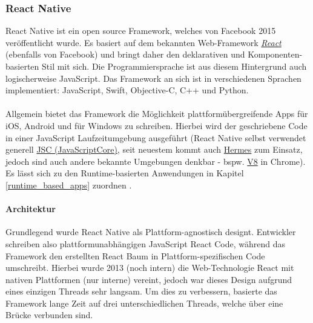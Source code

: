 \subsubsection{React Native}
\label{react-native}
React Native ist ein open source Framework, welches von Facebook 2015 veröffentlicht wurde. 
Es basiert auf dem bekannten Web-Framework \href{https://reactjs.org/}{\textit{React}} (ebenfalls von Facebook) und bringt daher den deklarativen und Komponenten-basierten Stil mit sich. 
Die Programmiersprache ist aus diesem Hintergrund auch logischerweise JavaScript.
Das Framework an sich ist in verschiedenen Sprachen implementiert: JavaScript, Swift, Objective-C, C++ und Python.\\
\\
Allgemein bietet das Framework die Möglichkeit plattformübergreifende Apps für iOS, Android und für Windows zu schreiben. Hierbei wird der geschriebene Code in einer JavaScript Laufzeitumgebung ausgeführt (React Native selbst verwendet generell \href{https://trac.webkit.org/wiki/JavaScriptCore}{JSC (JavaScriptCore)}, seit neuestem kommt auch \href{https://hermesengine.dev/}{Hermes} zum Einsatz, jedoch sind auch andere bekannte Umgebungen denkbar - bspw. \href{https://v8.dev/}{V8} in Chrome). 
Es lässt sich zu den Runtime-basierten Anwendungen in Kapitel \ref{runtime_based_apps} zuordnen \cite{reactnative2021}.\\
\paragraph{Architektur}
Grundlegend wurde React Native als Plattform-agnostisch designt. Entwickler schreiben also plattformunabhängigen JavaScript React Code, während das Framework den erstellten React Baum in Plattform-spezifischen Code umschreibt. Hierbei wurde 2013 (noch intern) die Web-Technologie React mit nativen Plattformen (nur interne) vereint, jedoch war dieses Design aufgrund eines einzigen Threads sehr langsam. Um dies zu verbessern, basierte das Framework lange Zeit auf drei unterschiedlichen Threads, welche über eine Brücke verbunden sind.

